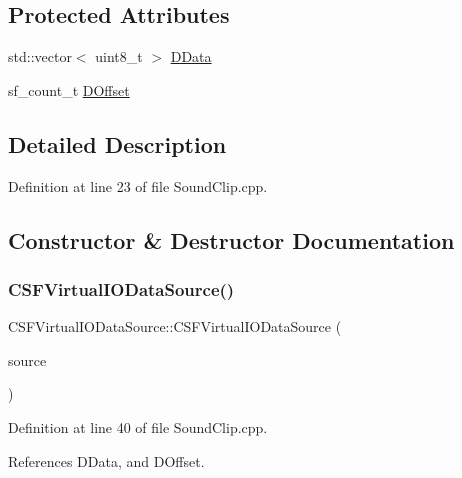 \subsection*{Protected Attributes}
\begin{DoxyCompactItemize}
\item 
std\+::vector$<$ uint8\+\_\+t $>$ \hyperlink{classCSFVirtualIODataSource_ac03be5c46b6647150e12edc04fa52ede}{D\+Data}
\item 
sf\+\_\+count\+\_\+t \hyperlink{classCSFVirtualIODataSource_a29db7bf8a3a7103deacb80bf619919c8}{D\+Offset}
\end{DoxyCompactItemize}


\subsection{Detailed Description}


Definition at line 23 of file Sound\+Clip.\+cpp.



\subsection{Constructor \& Destructor Documentation}
\hypertarget{classCSFVirtualIODataSource_acd8bf4483224c3101dafc14df967bc24}{}\label{classCSFVirtualIODataSource_acd8bf4483224c3101dafc14df967bc24} 
\subsubsection{\texorpdfstring{C\+S\+F\+Virtual\+I\+O\+Data\+Source()}{CSFVirtualIODataSource()}}
{\footnotesize\ttfamily C\+S\+F\+Virtual\+I\+O\+Data\+Source\+::\+C\+S\+F\+Virtual\+I\+O\+Data\+Source (\begin{DoxyParamCaption}\item[{std\+::shared\+\_\+ptr$<$ \hyperlink{classCDataSource}{C\+Data\+Source} $>$}]{source }\end{DoxyParamCaption})}



Definition at line 40 of file Sound\+Clip.\+cpp.



References D\+Data, and D\+Offset.


